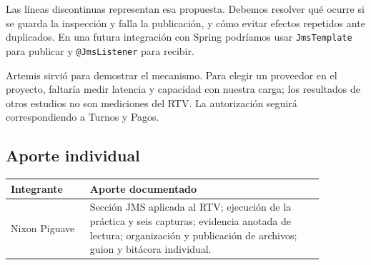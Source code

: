 \documentclass[a4paper,10pt]{article}
\begin{document}
Las líneas discontinuas representan esa propuesta. Debemos resolver qué ocurre si se guarda la inspección y falla la publicación, y cómo evitar efectos repetidos ante duplicados. En una futura integración con Spring podríamos usar \texttt{JmsTemplate} para publicar y \texttt{@JmsListener} para recibir.\cite{springjms}

Artemis sirvió para demostrar el mecanismo. Para elegir un proveedor en el proyecto, faltaría medir latencia y capacidad con nuestra carga; los resultados de otros estudios no son mediciones del RTV.\cite{maharjan2023} La autorización seguirá correspondiendo a Turnos y Pagos.

\subsection*{Aporte individual}
\begin{center}
\small
\begin{tabular}{|p{0.22\linewidth}|p{0.65\linewidth}|}
\hline
\textbf{Integrante} & \textbf{Aporte documentado} \\
\hline
Nixon Piguave & Sección JMS aplicada al RTV; ejecución de la práctica y seis capturas; evidencia anotada de lectura; organización y publicación de archivos; guion y bitácora individual. \\
\hline
\end{tabular}
\end{center}
\begingroup
\small
\printbibliography[heading=subbibliography,title={Fuentes del aporte}]
\endgroup
\end{document}
